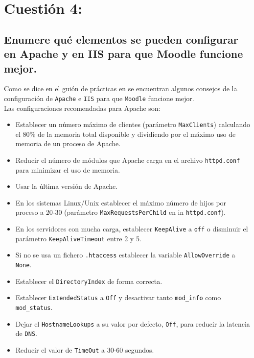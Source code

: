 \section{Cuestión 4:}

\subsection{Enumere qué elementos se pueden configurar en Apache y en IIS para que Moodle funcione mejor.}

Como se dice en el guión de prácticas en \cite{ejer4} se encuentran algunos consejos de la configuración de \texttt{Apache} e \texttt{IIS} para que \texttt{Moodle} funcione mejor.\\

Las configuraciones recomendadas para Apache son: 
\begin{itemize}
	\item Establecer un número máximo de clientes (parámetro \texttt{MaxClients}) calculando el 80\% de la memoria total disponible y dividiendo por el máximo uso de memoria de un proceso de Apache.  
	\item Reducir el número de módulos que Apache carga en el archivo \texttt{httpd.conf} para  minimizar el uso de memoria.
	\item Usar la última versión de Apache.
	\item En los sistemas Linux/Unix establecer el máximo número de hijos por proceso a 20-­30 (parámetro \texttt{MaxRequestsPerChild} en in \texttt{httpd.conf}).
	\item En los servidores con mucha carga, establecer \texttt{KeepAlive} a \texttt{off} o disminuir el parámetro \texttt{KeepAliveTimeout} entre 2 y 5.
	\item Si no se usa un fichero \texttt{.htaccess} establecer la variable \texttt{AllowOverride} a \texttt{None}.
	\item Establecer el \texttt{DirectoryIndex} de forma correcta.
	\item Establecer \texttt{ExtendedStatus} a \texttt{Off} y desactivar tanto \texttt{mod\_info} como \texttt{mod\_status}.
	\item Dejar el \texttt{HostnameLookups} a su valor por defecto, \texttt{Off}, para reducir la latencia de \texttt{DNS}.
	\item Reducir el valor de \texttt{TimeOut} a 30-60 segundos.
\end{itemize}

